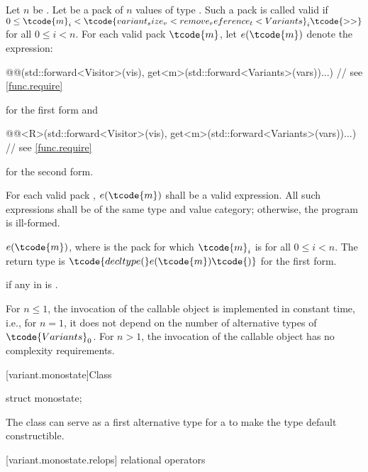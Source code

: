 \begin{itemdescr}
\pnum
Let $n$ be . Let  be a pack of $n$
values of type . Such a pack is called valid if $0 \leq
\tcode{m}_i < \tcode{variant_size_v<remove_reference_t<Variants}_i\tcode{>>}$ for
all $0 \leq i < n$. For each valid pack $\tcode{m}$, let $e(\tcode{m})$
denote the expression:
\begin{codeblock}
@@(std::forward<Visitor>(vis), get<m>(std::forward<Variants>(vars))...) // see \ref{func.require}
\end{codeblock}
for the first form and
\begin{codeblock}
@@<R>(std::forward<Visitor>(vis), get<m>(std::forward<Variants>(vars))...) // see \ref{func.require}
\end{codeblock}
for the second form.

\pnum
\requires
For each valid pack , $e(\tcode{m})$ shall be a valid expression.
All such expressions shall be of the same type and value category;
otherwise, the program is ill-formed.

\pnum
\returns
$e(\tcode{m})$, where  is the pack for which
$\tcode{m}_i$ is  for all $0 \leq i < n$.
The return type is $\tcode{decltype(}e(\tcode{m})\tcode{)}$
for the first form.

\pnum
\throws
{} if any  in  is .

\pnum
\complexity
For $n \leq 1$, the invocation of the callable object is
implemented in constant time, i.e., for $n = 1$, it does not depend on
the number of alternative types of $\tcode{Variants}_0$.
For $n > 1$, the invocation of the callable object has
no complexity requirements.
\end{itemdescr}

%
[variant.monostate]{Class }

\begin{itemdecl}
struct monostate{};
\end{itemdecl}

\begin{itemdescr}
\pnum
The class  can serve as a first alternative type for
a  to make the  type default constructible.
\end{itemdescr}


[variant.monostate.relops]{ relational operators}

